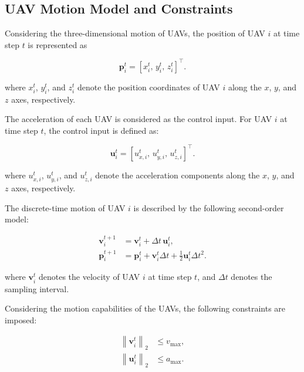 \subsection{UAV Motion Model and Constraints}

Considering the three-dimensional motion of UAVs, the position of UAV $i$ at time step $t$ is represented as

\begin{equation}
    \label{eq:uav_position}
    \mathbf{p}_i^t
    =
    \left[
    x_i^t,\,
    y_i^t,\,
    z_i^t
    \right]^{\top}.
\end{equation}

\noindent
where $x_i^t$, $y_i^t$, and $z_i^t$ denote the position coordinates of UAV $i$ along the $x$, $y$, and $z$ axes, respectively.

The acceleration of each UAV is considered as the control input.
For UAV $i$ at time step $t$, the control input is defined as:

\begin{equation}
    \label{eq:uav_control_input}
    \mathbf{u}_i^t
    =
    \left[
    u_{x,i}^t,\,
    u_{y,i}^t,\,
    u_{z,i}^t
    \right]^{\top}.
\end{equation}

\noindent
where $u_{x,i}^t$, $u_{y,i}^t$, and $u_{z,i}^t$ denote the acceleration components along the $x$, $y$, and $z$ axes, respectively.

The discrete-time motion of UAV $i$ is described by the following second-order model:

\begin{equation}
    \label{eq:uav_dynamics}
    \begin{aligned}
        \mathbf{v}_i^{t+1}
        &=
        \mathbf{v}_i^t
        +
        \Delta t\,\mathbf{u}_i^t,\\
        \mathbf{p}_i^{t+1}
        &=
        \mathbf{p}_i^t
        +
        \mathbf{v}_i^t\Delta t
        +
        \frac{1}{2}
        \mathbf{u}_i^t\Delta t^2.
    \end{aligned}
\end{equation}

\noindent
where $\mathbf{v}_i^t$ denotes the velocity of UAV $i$ at time step $t$, and $\Delta t$ denotes the sampling interval.

Considering the motion capabilities of the UAVs, the following constraints are imposed:

\begin{equation}
    \label{eq:motion_constraints}
    \begin{aligned}
        \left\|\mathbf{v}_i^t\right\|_2
        &\leq v_{\max},\\
        \left\|\mathbf{u}_i^t\right\|_2
        &\leq a_{\max}.
    \end{aligned}
\end{equation}

